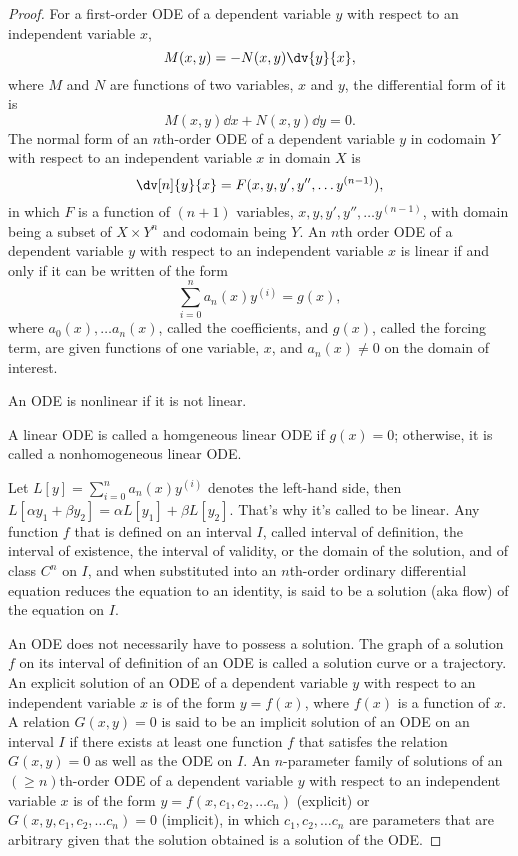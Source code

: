 \documentclass[a4paper,12pt]{report}
\begin{document}
\begin{itemize}
\begin{itemize}
\begin{proof}
For a first-order ODE of a dependent variable $y$ with respect to an independent variable $x$,
\[M(x,y)=-N(x,y)\dv{y}{x},\]
where $M$ and $N$ are functions of two variables, $x$ and $y$, the differential form of it is
\[M(x,y)\dd{x}+N(x,y)\dd{y}=0.\]
The normal form of an $n$th-order ODE of a dependent variable $y$ in codomain $Y$ with respect to an independent variable $x$ in domain $X$ is
\[\dv[n]{y}{x}=F(x,y,y',y'',\dots y^{(n-1)}),\]
in which $F$ is a function of $(n+1)$ variables, $x,y,y',y'',\dots y^{(n-1)}$, with domain being a subset of $X\times Y^n$ and codomain being $Y$.
An $n$th order ODE of a dependent variable $y$ with respect to an independent variable $x$ is linear if and only if it can be written of the form
\[\sum_{i=0}^na_n(x)y^{(i)}=g(x),\]
where $a_0(x),\dots a_n(x)$, called the coefficients, and $g(x)$, called the forcing term, are given functions of one variable, $x$, and $a_n(x)\neq 0$ on the domain of interest.

An ODE is nonlinear if it is not linear.

A linear ODE is called a homgeneous linear ODE if $g(x)=0$; otherwise, it is called a nonhomogeneous linear ODE.

Let $L[y]=\sum_{i=0}^na_n(x)y^{(i)}$ denotes the left-hand side, then $L[\alpha y_1+\beta y_2]=\alpha L[y_1]+\beta L[y_2]$. That's why it's called to be linear.
Any function $f$ that is defined on an interval $I$, called interval of definition, the interval of existence, the interval of validity, or the domain of the solution, and of class $C^n$ on $I$, and when substituted into an $n$th-order ordinary differential equation reduces the equation to an identity, is said to be a solution (aka flow) of the equation on $I$.

An ODE does not necessarily have to possess a solution.
The graph of a solution $f$ on its interval of definition of an ODE is called a solution curve or a trajectory.
An explicit solution of an ODE of a dependent variable $y$ with respect to an independent variable $x$ is of the form $y=f(x)$, where $f(x)$ is a function of $x$.
A relation $G(x, y) = 0$ is said to be an implicit solution of an ODE on an interval $I$ if there exists at least one function $f$ that satisfes the relation $G(x, y) = 0$ as well as the ODE on $I$.
An $n$-parameter family of solutions of an $(\geq n)$th-order ODE of a dependent variable $y$ with respect to an independent variable $x$ is of the form $y=f(x,c_1,c_2,\dots c_n)$ (explicit) or $G(x,y,c_1,c_2,\dots c_n)=0$ (implicit), in which $c_1,c_2,\dots c_n$ are parameters that are arbitrary given that the solution obtained is a solution of the ODE.


\end{proof}
\end{itemize}
\end{itemize}
\end{document}
